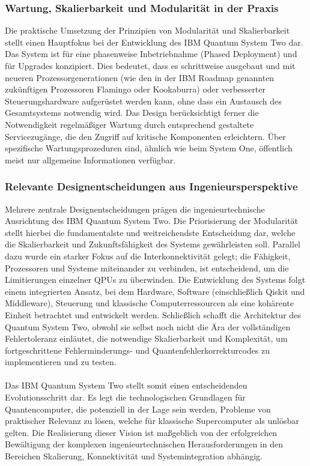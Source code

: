 \subsubsection{Wartung, Skalierbarkeit und Modularität in der Praxis}
Die praktische Umsetzung der Prinzipien von Modularität und Skalierbarkeit stellt einen Hauptfokus bei der Entwicklung des IBM Quantum System Two dar. Das System ist für eine phasenweise Inbetriebnahme (Phased Deployment) und für Upgrades konzipiert. Dies bedeutet, dass es schrittweise ausgebaut und mit neueren Prozessorgenerationen (wie den in der IBM Roadmap genannten zukünftigen Prozessoren Flamingo oder Kookaburra) oder verbesserter Steuerungshardware aufgerüstet werden kann, ohne dass ein Austausch des Gesamtsystems notwendig wird. Das Design berücksichtigt ferner die Notwendigkeit regelmäßiger Wartung durch entsprechend gestaltete Servicezugänge, die den Zugriff auf kritische Komponenten erleichtern. Über spezifische Wartungsprozeduren sind, ähnlich wie beim System One, öffentlich meist nur allgemeine Informationen verfügbar.

\subsubsection{Relevante Designentscheidungen aus Ingenieursperspektive}
Mehrere zentrale Designentscheidungen prägen die ingenieurtechnische Ausrichtung des IBM Quantum System Two. Die Priorisierung der Modularität stellt hierbei die fundamentalste und weitreichendste Entscheidung dar, welche die Skalierbarkeit und Zukunftsfähigkeit des Systems gewährleisten soll. Parallel dazu wurde ein starker Fokus auf die Interkonnektivität gelegt; die Fähigkeit, Prozessoren und Systeme miteinander zu verbinden, ist entscheidend, um die Limitierungen einzelner QPUs zu überwinden. Die Entwicklung des Systems folgt einem integrierten Ansatz, bei dem Hardware, Software (einschließlich Qiskit und Middleware), Steuerung und klassische Computerressourcen als eine kohärente Einheit betrachtet und entwickelt werden. Schließlich schafft die Architektur des Quantum System Two, obwohl sie selbst noch nicht die Ära der vollständigen Fehlertoleranz einläutet, die notwendige Skalierbarkeit und Komplexität, um fortgeschrittene Fehlerminderungs- und Quantenfehlerkorrekturcodes zu implementieren und zu testen.
\\\\
Das IBM Quantum System Two stellt somit einen entscheidenden Evolutionsschritt dar. Es legt die technologischen Grundlagen für Quantencomputer, die potenziell in der Lage sein werden, Probleme von praktischer Relevanz zu lösen, welche für klassische Supercomputer als unlösbar gelten. Die Realisierung dieser Vision ist maßgeblich von der erfolgreichen Bewältigung der komplexen ingenieurtechnischen Herausforderungen in den Bereichen Skalierung, Konnektivität und Systemintegration abhängig.


\printbibliography
